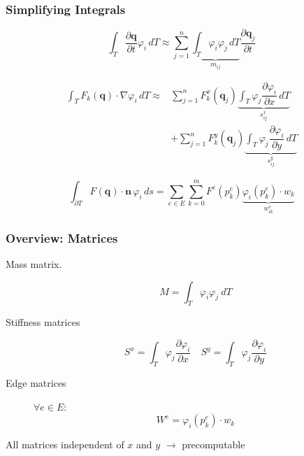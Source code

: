 \documentclass{beamer}
\newcommand{\pd}[2]{\dfrac{\partial #1}{\partial #2}}
\renewcommand{\phi}{\varphi}
\begin{document}
\begin{frame}
  \frametitle{Simplifying Integrals}

  \begin{equation*}
    \label{sec:first-integral}
    \int_T \pd {\mathbf{q}}{t} \phi_i \, dT \approx \sum_{j=1}^n \underbrace{\int_T \phi_i \phi_j \, dT}_{m_{ij}} \pd{\mathbf{q}_j}{t}
  \end{equation*}
  
  \begin{eqnarray*}
    \label{sec:third-integral}
    \int_T F_k(\mathbf{q}) \cdot \nabla \phi_i \, dT \approx &
    \sum_{j=1}^n F_k^x\left(\mathbf{q}_j\right) \underbrace{\int_T \phi_j \pd{\phi_i}{x} \, dT}_{s^x_{ij}} \\
    {} & + \sum_{j=1}^n F_k^y\left(\mathbf{q}_j\right) \underbrace{\int_T \phi_j \pd{\phi_i}{y} \, dT}_{s^y_{ij}}
  \end{eqnarray*}

  \begin{equation}
    \label{eq:second-integral}
    \int_{\partial T} F(\mathbf{q}) \cdot \mathbf{n} \, \phi_i \, ds = \sum_{e \in E} \sum_{k=0}^{m} F^e(p_k^e) \underbrace{\phi_i(p_k^e) \cdot w_k}_{w_{ik}^e}
  \end{equation}
\end{frame}

\begin{frame}
  \frametitle{Overview: Matrices}
  \begin{description}
  \item[Mass matrix.]
    \begin{equation}
      \label{eq:mass-matrix-overview}
      M = \int_T \phi_i \phi_j \ dT
    \end{equation}
  \item[Stiffness matrices]
    \begin{equation}
      \label{eq:stiffness-matrix-overview}
      S^x = \int_T \phi_j \pd{\phi_i}{x} \quad
      S^y = \int_T \phi_j \pd{\phi_i}{y}
    \end{equation}
  \item[Edge matrices] $\forall e \in E$:
    \begin{equation}
      \label{eq:edge-matrices}
      W^e = \phi_i\left(p_k^e\right) \cdot w_k
    \end{equation}
  \end{description}

  All matrices independent of $x$ and $y$ $\rightarrow$ precomputable
\end{frame}
\end{document}
